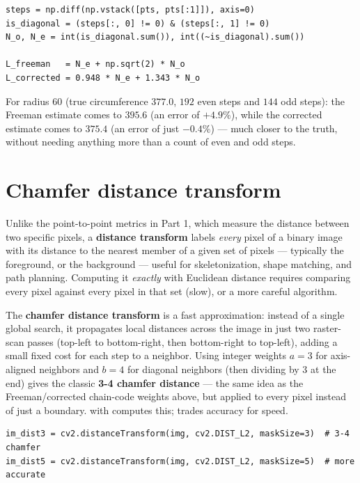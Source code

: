 \begin{lstlisting}
steps = np.diff(np.vstack([pts, pts[:1]]), axis=0)
is_diagonal = (steps[:, 0] != 0) & (steps[:, 1] != 0)
N_o, N_e = int(is_diagonal.sum()), int((~is_diagonal).sum())

L_freeman   = N_e + np.sqrt(2) * N_o
L_corrected = 0.948 * N_e + 1.343 * N_o
\end{lstlisting}

For radius 60 (true circumference $377.0$, $192$ even steps and $144$ odd steps): the Freeman estimate comes to $395.6$ (an error of $+4.9\%$), while the corrected estimate comes to $375.4$ (an error of just $-0.4\%$) --- much closer to the truth, without needing anything more than a count of even and odd steps.

\section{Chamfer distance transform}

Unlike the point-to-point metrics in Part 1, which measure the distance between two specific pixels, a \textbf{distance transform} labels \emph{every} pixel of a binary image with its distance to the nearest member of a given set of pixels --- typically the foreground, or the background --- useful for skeletonization, shape matching, and path planning. Computing it \emph{exactly} with Euclidean distance requires comparing every pixel against every pixel in that set (slow), or a more careful algorithm.

The \textbf{chamfer distance transform} is a fast approximation: instead of a single global search, it propagates local distances across the image in just two raster-scan passes (top-left to bottom-right, then bottom-right to top-left), adding a small fixed cost for each step to a neighbor. Using integer weights $a=3$ for axis-aligned neighbors and $b=4$ for diagonal neighbors (then dividing by 3 at the end) gives the classic \textbf{3-4 chamfer distance} --- the same idea as the Freeman/corrected chain-code weights above, but applied to every pixel instead of just a boundary.  with  computes this;  trades accuracy for speed.

\begin{lstlisting}
im_dist3 = cv2.distanceTransform(img, cv2.DIST_L2, maskSize=3)  # 3-4 chamfer
im_dist5 = cv2.distanceTransform(img, cv2.DIST_L2, maskSize=5)  # more accurate
\end{lstlisting}

